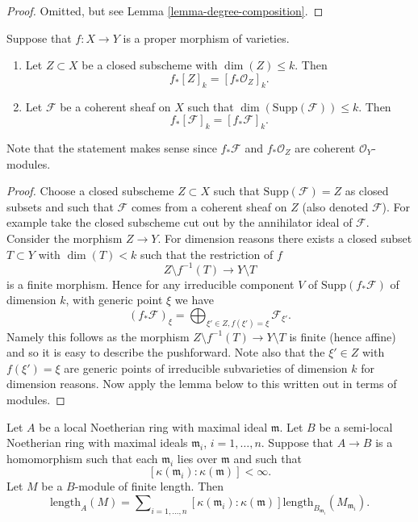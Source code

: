 \begin{proof}
Omitted, but see Lemma \ref{lemma-degree-composition}.
\end{proof}


\begin{lemma}
\label{lemma-cycle-push-sheaf}
Suppose that $f : X \to Y$ is a proper morphism of varieties.
\begin{enumerate}
\item Let $Z \subset X$ be a closed subscheme with
$\dim(Z) \leq k$. Then
$$
f_*[Z]_k = [f_*{\mathcal O}_Z]_k.
$$
\item Let $\mathcal{F}$ be a coherent sheaf on $X$ such that
$\dim(\text{Supp}(\mathcal{F})) \leq k$. Then
$$
f_*[\mathcal{F}]_k = [f_*{\mathcal F}]_k.
$$
\end{enumerate}
Note that the statement makes sense since $f_*\mathcal{F}$ and
$f_*\mathcal{O}_Z$ are coherent $\mathcal{O}_Y$-modules.
\end{lemma}

\begin{proof}
Choose a closed subscheme $Z \subset X$ such that
$\text{Supp}(\mathcal{F}) = Z$ as closed subsets and such
that $\mathcal{F}$ comes from a coherent sheaf on $Z$
(also denoted $\mathcal{F}$). For example take the closed subscheme
cut out by the annihilator ideal of $\mathcal{F}$. Consider the
morphism $Z \to Y$. For dimension reasons there exists a closed
subset $T \subset Y$ with $\dim(T) < k$ such that the restriction of $f$
$$
Z \setminus f^{-1}(T) \longrightarrow Y \setminus T
$$
is a finite morphism. Hence for any irreducible component $V$
of $\text{Supp}(f_*\mathcal{F})$ of dimension $k$, with generic point $\xi$
we have
$$
(f_*\mathcal{F})_\xi
=
\bigoplus\nolimits_{\xi' \in Z, f(\xi') = \xi} \mathcal{F}_{\xi'}.
$$
Namely this follows as the morphism
$Z \setminus f^{-1}(T) \longrightarrow Y \setminus T$ is finite (hence affine)
and so it is easy to describe the pushforward.
Note also that the $\xi' \in Z$ with $f(\xi') = \xi$ are generic points
of irreducible subvarieties of dimension $k$ for dimension reasons.
Now apply the lemma below to
this written out in terms of modules.
\end{proof}

\begin{lemma}
\label{lemma-cycle-push-sheaf-algebra}
Let $A$ be a local Noetherian ring with maximal ideal $\mathfrak m$.
Let $B$ be a semi-local Noetherian ring with maximal ideals $\mathfrak m_i$,
$i = 1, \ldots, n$.
Suppose that $A \to B$ is a homomorphism such that each $\mathfrak m_i$
lies over $\mathfrak m$ and such that
$$
[\kappa(\mathfrak m_i) : \kappa(\mathfrak m)] < \infty.
$$
Let $M$ be a $B$-module of finite length.
Then
$$
\text{length}_A(M) = \sum\nolimits_{i = 1, \ldots, n}
[\kappa(\mathfrak m_i) : \kappa(\mathfrak m)]
\text{length}_{B_{\mathfrak m_i}}(M_{\mathfrak m_i}).
$$
\end{lemma}


